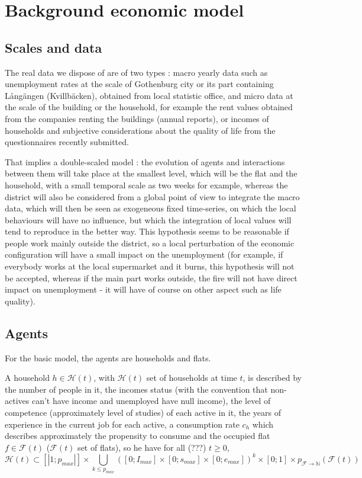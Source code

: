 \documentclass[english]{article}
\begin{document}
\section{Background economic model}


\subsection{Scales and data}

The real data we dispose of are of two types : macro yearly data such
as unemployment rates at the scale of Gothenburg city or its part
containing L{\aa}ngängen (Kvillbäcken), obtained from local statistic
office, and micro data at the scale of the building or the household,
for example the rent values obtained from the companies renting the
buildings (annual reports), or incomes of households and subjective
considerations about the quality of life from the questionnaires recently
submitted.

That implies a double-scaled model : the evolution of agents and interactions
between them will take place at the smallest level, which will be
the flat and the household, with a small temporal scale as two weeks
for example, whereas the district will also be considered from a global
point of view to integrate the macro data, which will then be seen
as exogeneous fixed time-series, on which the local behaviours will
have no influence, but which the integration of local values will
tend to reproduce in the better way. This hypothesis seems to be reasonable
if people work mainly outside the district, so a local perturbation
of the economic configuration will have a small impact on the unemployment
(for example, if everybody works at the local supermarket and it burns,
this hypothesis will not be accepted, whereas if the main part works outside,
the fire will not have direct impact on unemployment - it will have of
course on other aspect such as life quality).


\subsection{Agents}

For the basic model, the agents are households and flats.

A household $h\in\mathcal{H}(t)$, with $\mathcal{H}(t)$ set of households
at time $t$, is described by the number of people in it, the incomes
status (with the convention that non-actives can't have income and
unemployed have null income), the level of competence (approximately
level of studies) of each active in it, the years of experience in
the current job for each active, a consumption rate $c_{h}$ which
describes approximately the propensity to consume and the occupied
flat $f\in\mathcal{F}(t)$ ($\mathcal{F}(t)$ set of flats), so he
have for all (???) $t\geq0$,
\[
\mathcal{H}(t)\subset\left[\left|1;p_{max}\right|\right]\times\bigcup_{k\leq p_{max}}([0;I_{max}]\times[0;s_{max}]\times[0;e_{max}])^{k}\times[0;1]\times p_{\mathcal{F\rightarrow\mathbb{N}}}(\mathcal{F}(t))
\]
\end{document}
